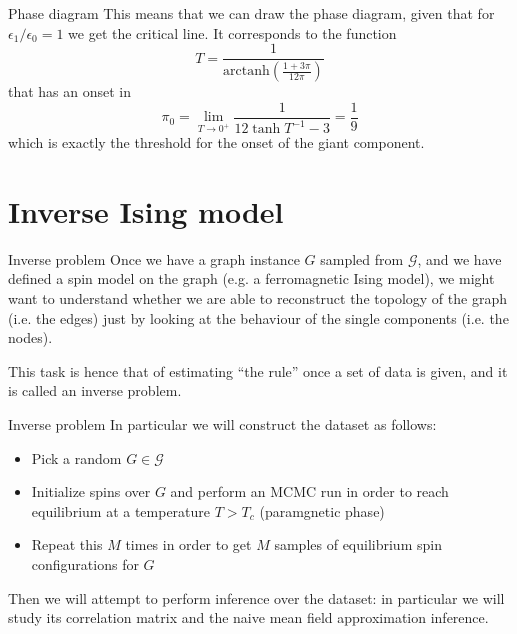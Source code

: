 \documentclass[handout]{beamer}
\newcommand{\arctanh}{\text{arctanh}}
\begin{document}
\begin{frame}{Phase diagram}
    This means that we can draw the phase diagram, given that for $\epsilon_1 /
    \epsilon_0 = 1$ we get the critical line. It corresponds to the function
    $$
        T = \frac{1}{\arctanh \left( \frac{1+3\pi}{12\pi} \right)}
    $$
    that has an onset in
    $$
        \pi_0 = \lim_{T\to 0^+} \frac{1}{12\tanh{T^{-1}}-3} = \frac{1}{9}
    $$
    which is exactly the threshold for the onset of the giant component.
\end{frame}

\section{Inverse Ising model}

\begin{frame}{Inverse problem}
    Once we have a graph instance $G$ sampled from $\mathcal{G}$, and we have
    defined a spin model on the graph (e.g. a ferromagnetic Ising model), we
    might want to understand whether we are able to \alert{reconstruct} the
    topology of the graph (i.e. the edges) just by looking at the behaviour of
    the single components (i.e. the nodes).
    
    This task is hence that of estimating ``the rule'' once a set of data is
    given, and it is called an \alert{inverse problem}.
\end{frame}

\begin{frame}{Inverse problem}
    In particular we will construct the dataset as follows:
    \begin{itemize}
        \item Pick a random $G \in \mathcal{G}$
        \item Initialize spins over $G$ and perform an MCMC run in order to
            reach equilibrium at a temperature $T > T_c$ (\alert{paramgnetic}
            phase)
        \item Repeat this $M$ times in order to get $M$ samples of equilibrium
            spin configurations for $G$
    \end{itemize}

    Then we will attempt to perform inference over the dataset: in particular we
    will study its \alert{correlation matrix} and the \alert{naive mean field
    approximation inference}.
\end{frame}
\end{document}
